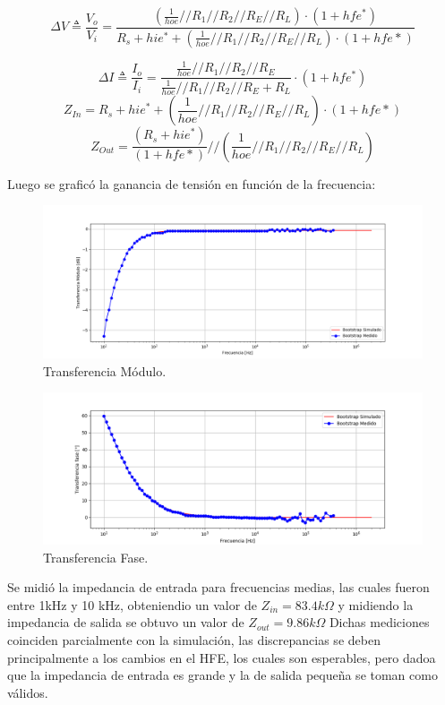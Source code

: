 \documentclass[a4paper]{article}
\begin{document}
\begin{equation}
	\Delta V \triangleq \frac{V_o}{V_i} = \frac{ \left(\frac{1}{hoe} // R_1 // R_2 // R_E // R_L  \right)\cdot (1+hfe^*)}{R_s + hie^* + \left(\frac{1}{hoe} // R_1 // R_2 // R_E // R_L  \right)\cdot (1+hfe*) } 
\end{equation}

\begin{equation} \Delta I \triangleq \frac{I_o}{I_i} =  \frac{\frac{1}{hoe} // R_1 // R_2 // R_E}{\frac{1}{hoe} // R_1 // R_2 // R_E+R_L} \cdot (1+hfe^*)
\end{equation}
\begin{equation} Z_{In} = R_s + hie^* + \left(\frac{1}{hoe} // R_1 // R_2 // R_E // R_L  \right)\cdot (1+hfe*)\end{equation}
\begin{equation} Z_{Out} = \frac{(R_s + hie^*)}{(1+hfe*)} //  \left(\frac{1}{hoe} // R_1 // R_2 // R_E // R_L  \right)\end{equation}

Luego se graficó la ganancia de tensión en función de la frecuencia:
\begin{figure} [H]
	\centering
	\includegraphics[width=\textwidth]{imagenes/avs.png}
	\caption{Transferencia Módulo.}
	\label{fig:transmod}
\end{figure}
\begin{figure} [H]
	\centering
	\includegraphics[width=\textwidth]{imagenes/avsp.png}
	\caption{Transferencia Fase.}
	\label{fig:transph}
\end{figure}
Se midió la impedancia de entrada para frecuencias medias, las cuales fueron entre 1kHz y 10 kHz, obteniendio un valor de $Z_{in}=83.4k\Omega$ y midiendo la impedancia de salida se obtuvo un valor de $Z_{out} = 9.86 k \Omega $
Dichas mediciones coinciden parcialmente con la simulación, las discrepancias se deben principalmente a los cambios en el HFE, los cuales son esperables, pero dadoa  que la impedancia de entrada es grande y la de salida pequeña se toman como válidos.
\end{document}
